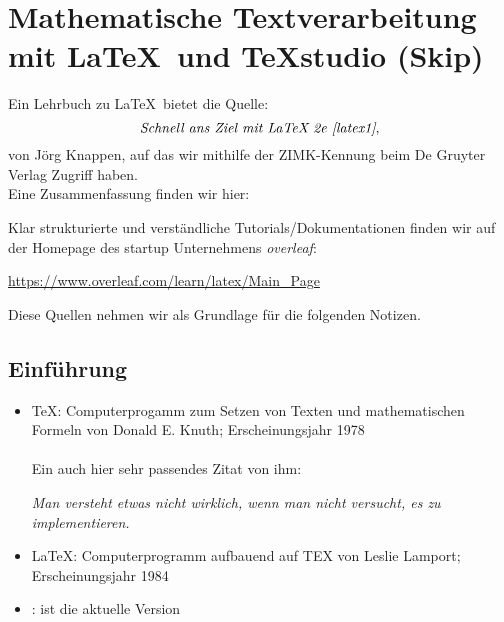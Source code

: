 \section{Mathematische Textverarbeitung mit \LaTeX~und TeXstudio (Skip)}
Ein Lehrbuch zu \LaTeX~bietet die Quelle: 
$$\textit{Schnell ans Ziel mit LaTeX 2e \cite{latex1}},$$ 
von Jörg Knappen, auf das wir mithilfe der ZIMK-Kennung beim De Gruyter Verlag Zugriff haben.\\ 
Eine Zusammenfassung finden wir hier:
\begin{center}
\end{center}
Klar strukturierte und verständliche Tutorials/Dokumentationen finden wir auf der Homepage des startup Unternehmens \textit{overleaf}:
\begin{center}
	\url{https://www.overleaf.com/learn/latex/Main_Page}
\end{center}
Diese Quellen nehmen wir als Grundlage für die folgenden Notizen.\\


\subsection{Einführung}
\begin{itemize}
	\item \TeX: Computerprogamm zum Setzen von Texten und mathematischen Formeln von Donald E. Knuth; Erscheinungsjahr 1978\\~\\
	Ein auch hier sehr passendes Zitat von ihm:
	\begin{center}
	\textit{	Man versteht etwas nicht wirklich, wenn man nicht versucht, es zu implementieren.}
	\end{center}
	
\item \LaTeX: Computerprogramm aufbauend auf TEX von Leslie Lamport; Erscheinungsjahr 1984
\item \LaTeXe: ist die aktuelle Version
\end{itemize}

